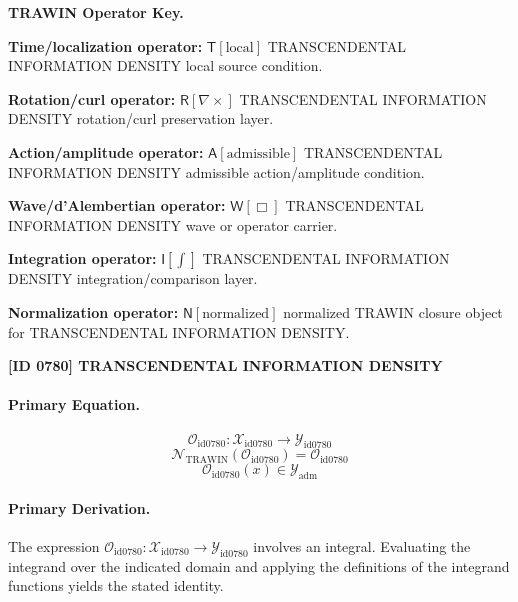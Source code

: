 \par\vspace{0.45\baselineskip}
\noindent\begin{minipage}[t]{\linewidth}
\begingroup
\small
\raggedright
\textbf{TRAWIN Operator Key.}\par
\noindent\textbf{Time/localization operator:} $\mathsf{T}\!\left[\mathrm{local}\right]$ TRANSCENDENTAL INFORMATION DENSITY local source condition.\par
\noindent\textbf{Rotation/curl operator:} $\mathsf{R}\!\left[\nabla\times\right]$ TRANSCENDENTAL INFORMATION DENSITY rotation/curl preservation layer.\par
\noindent\textbf{Action/amplitude operator:} $\mathsf{A}\!\left[\mathrm{admissible}\right]$ TRANSCENDENTAL INFORMATION DENSITY admissible action/amplitude condition.\par
\noindent\textbf{Wave/d'Alembertian operator:} $\mathsf{W}\!\left[\Box\right]$ TRANSCENDENTAL INFORMATION DENSITY wave or operator carrier.\par
\noindent\textbf{Integration operator:} $\mathsf{I}\!\left[\int\right]$ TRANSCENDENTAL INFORMATION DENSITY integration/comparison layer.\par
\noindent\textbf{Normalization operator:} $\mathsf{N}\!\left[\mathrm{normalized}\right]$ normalized TRAWIN closure object for TRANSCENDENTAL INFORMATION DENSITY.\par
\endgroup
\end{minipage}

\clearpage
\noindent\textbf{[ID 0780] TRANSCENDENTAL INFORMATION DENSITY}\par
\vspace{0.35em}
\paragraph{Primary Equation.}
\[
\mathcal{O}_{\mathrm{id0780}}:\mathcal{X}_{\mathrm{id0780}}\longrightarrow\mathcal{Y}_{\mathrm{id0780}}
\]
\[
\mathcal{N}_{\mathrm{TRAWIN}}(\mathcal{O}_{\mathrm{id0780}})=\mathcal{O}_{\mathrm{id0780}}
\]
\[
\mathcal{O}_{\mathrm{id0780}}(x)\in\mathcal{Y}_{\mathrm{adm}}
\]

\paragraph{Primary Derivation.}
The expression \( \mathcal{O}_{\mathrm{id0780}}:\mathcal{X}_{\mathrm{id0780}}\longrightarrow\mathcal{Y}_{\mathrm{id0780}} \) involves an integral. Evaluating the integrand over the indicated domain and applying the definitions of the integrand functions yields the stated identity.

